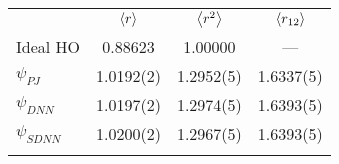 \begin{tabular}{l*3{S[table-format=3.6]}}
\toprule
\addlinespace
& {$\expval{r}$} & {$\expval{r^2}$} & {$\expval{r_{12}}$} \\
\addlinespace
\midrule
\addlinespace
\addlinespace
Ideal HO    & 0.88623 & 1.00000 & {---}\\
$\psi_{PJ}$ & 1.0192(2) & 1.2952(5) & 1.6337(5)\\
$\psi_{DNN}$  & 1.0197(2) & 1.2974(5) & 1.6393(5)\\
$\psi_{SDNN}$ & 1.0200(2) & 1.2967(5) & 1.6393(5)\\
\addlinespace\addlinespace\bottomrule
\end{tabular}